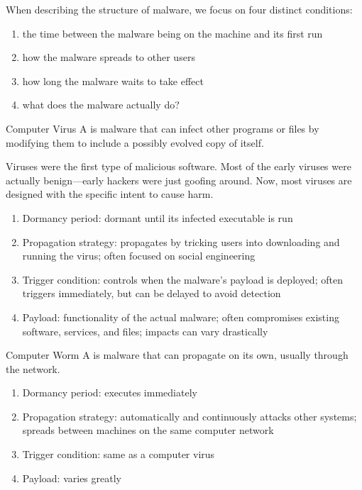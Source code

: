\documentclass[code]{amznotes}
\begin{document}
When describing the structure of malware, we focus on four distinct conditions:
\begin{enumerate}[noitemsep]
    \item {} the time between the malware being on the machine and its first run
    \item {} how the malware spreads to other users
    \item {} how long the malware waits to take effect
    \item {} what does the malware actually do?
\end{enumerate}

\begin{dfnbox}{Computer Virus}{}
    A  is malware that can infect other programs or files by modifying them to include a possibly evolved copy of itself.
\end{dfnbox}

Viruses were the first type of malicious software. Most of the early viruses were actually benign---early hackers were just goofing around. Now, most viruses are designed with the specific intent to cause harm.

\begin{enumerate}[noitemsep]
    \item Dormancy period: dormant until its infected executable is run
    \item Propagation strategy: propagates by tricking users into downloading and running the virus; often focused on social engineering
    \item Trigger condition: controls when the malware's payload is deployed; often triggers immediately, but can be delayed to avoid detection
    \item Payload: functionality of the actual malware; often compromises existing software, services, and files; impacts can vary drastically
\end{enumerate}

\begin{dfnbox}{Computer Worm}{}
    A  is malware that can propagate on its own, usually through the network.
\end{dfnbox}

\begin{enumerate}
    \item Dormancy period: executes immediately
    \item Propagation strategy: automatically and continuously attacks other systems; spreads between machines on the same computer network
    \item Trigger condition: same as a computer virus
    \item Payload: varies greatly
\end{enumerate}
\end{document}
